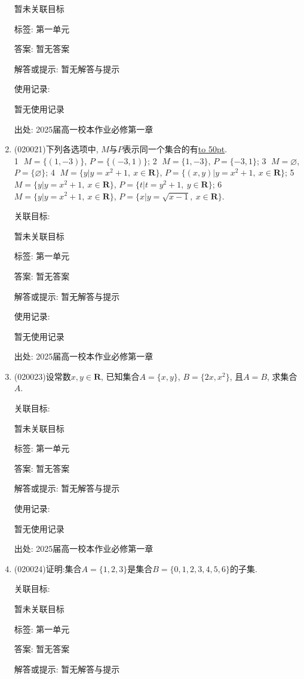 \documentclass[10pt,a4paper]{article}
\newcommand{\blank}[1]{\underline{\hbox to #1pt{}}}
\begin{document}
\begin{enumerate}[1.]
暂未关联目标



标签: 第一单元

答案: 暂无答案

解答或提示: 暂无解答与提示

使用记录:

暂无使用记录


出处: 2025届高一校本作业必修第一章
\item { (020021)}下列各选项中, $M$与$P$表示同一个集合的有\blank{50}.\\
\textcircled{1} $M=\{(1, -3)\}$, $P=\{(-3, 1)\}$; \textcircled{2} $M=\{1, -3\}$, $P=\{-3, 1\}$; \textcircled{3} $M=\varnothing$, $P=\{\varnothing\}$; \textcircled{4} $M=\{y|y=x^2+1, \  x\in\mathbf{R}\}$, $P=\{(x, y)|y=x^2+1, \ x\in\mathbf{R}\}$; \textcircled{5} $M=\{y|y=x^2+1, \  x\in\mathbf{R}\}$, $P=\{t|t=y^2+1, \ y\in\mathbf{R}\}$; \textcircled{6} $M=\{y|y=x^2+1, \  x\in\mathbf{R}\}$, $P=\{x|y=\sqrt{x-1},\  x\in\mathbf{R}\}$.


关联目标:

暂未关联目标



标签: 第一单元

答案: 暂无答案

解答或提示: 暂无解答与提示

使用记录:

暂无使用记录


出处: 2025届高一校本作业必修第一章
\item { (020023)}设常数$x,y\in \mathbf{R}$, 已知集合$A=\{x, y\}$, $B=\{2x, x^2\}$, 且$A=B$, 求集合$A$.


关联目标:

暂未关联目标



标签: 第一单元

答案: 暂无答案

解答或提示: 暂无解答与提示

使用记录:

暂无使用记录


出处: 2025届高一校本作业必修第一章
\item { (020024)}证明:集合$A=\{1,2,3\}$是集合$B=\{0,1,2,3,4,5,6\}$的子集.


关联目标:

暂未关联目标



标签: 第一单元

答案: 暂无答案

解答或提示: 暂无解答与提示


\end{enumerate}
\end{document}
